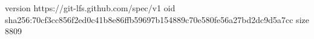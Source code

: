 version https://git-lfs.github.com/spec/v1
oid sha256:70cf3cc856f2ed0c41b8e86ffb59697b154889c70e580fe56a27bd2dc9d5a7cc
size 8809
